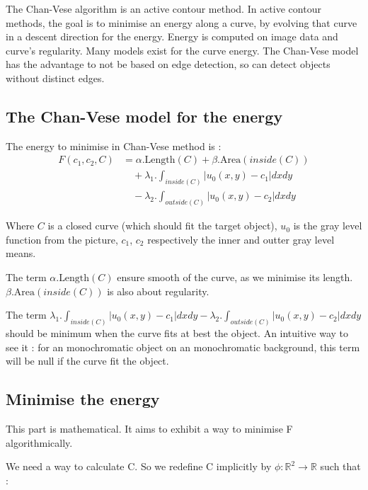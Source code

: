 The Chan-Vese algorithm is an active contour method. In active contour methods, the goal is to minimise an energy along a curve, by evolving that curve in a descent direction for the energy. Energy is computed on image data and curve's regularity.
Many models exist for the curve energy. The Chan-Vese model has the advantage to not be based on edge detection, so can detect objects without distinct edges.

\subsection{The Chan-Vese model for the energy}

The energy to minimise in Chan-Vese method is :
\begin{equation}
\begin{split}
F(c_1,c_2,C)& = \alpha . \text{Length}(C) + \beta . \text{Area}(inside(C)) \\
            & \quad + \lambda_1.\int_{inside(C)} |u_0(x,y) - c_1| dx dy \\
            & \quad - \lambda_2.\int_{outside(C)} |u_0(x,y) - c_2| dx dy
\label{cv_energy}
\end{split}
\end{equation}

Where $C$ is a closed curve (which should fit the target object), $u_0$ is the gray level function from the picture, $c_1$, $c_2$ respectively the inner and outter gray level means. 

The term $\alpha.\text{Length}(C)$ ensure smooth of the curve, as we minimise its length. $\beta . \text{Area}(inside(C))$ is also about regularity. 

The term $ \lambda_1.\int_{inside(C)} |u_0(x,y) - c_1| dx dy - \lambda_2.\int_{outside(C)} |u_0(x,y) - c_2| dx dy$ should be minimum when the curve fits at best the object. An intuitive way to see it : for an monochromatic object on an monochromatic background, this term will be null if the curve fit the object.

\subsection{Minimise the energy}

This part is mathematical. It aims to exhibit a way to minimise F algorithmically.

We need a way to calculate C. So we redefine C implicitly by $\phi : \mathbb{R}^2 \rightarrow \mathbb{R}$ such that : \\


